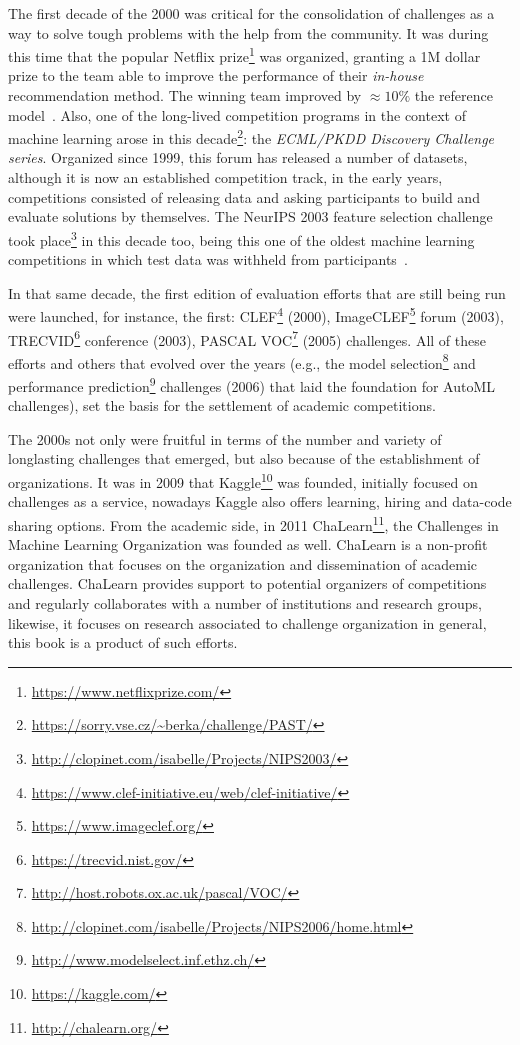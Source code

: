 \documentclass[twoside,11pt]{article}
\begin{document}
The first decade of the 2000 was critical for the consolidation of challenges as a way to solve tough problems with the help from the community. It was during this time that the popular Netflix prize\footnote{\url{https://www.netflixprize.com/}} was organized, granting a 1M dollar prize to the team able to improve the performance of their \emph{in-house} recommendation method. The winning team  improved by $\approx 10\%$ the reference model~\citep{bellkor}.  %
Also, one of the long-lived competition programs in the context  of machine learning  arose in this decade\footnote{\url{https://sorry.vse.cz/~berka/challenge/PAST/}}: the \emph{ECML/PKDD Discovery Challenge series}. Organized since 1999, this forum has released a number of datasets, although it is now an established competition track, in the early years, competitions consisted of releasing data and asking participants to build and evaluate solutions by themselves. The NeurIPS 2003 feature selection challenge took place\footnote{\url{http://clopinet.com/isabelle/Projects/NIPS2003/}} in this decade too, being this one of the oldest  machine learning competitions in which test data was withheld from participants~\citep{NIPS2004_5e751896}. 
 

In that same decade, the first edition of evaluation efforts that are still being run were launched, for instance, the first: CLEF\footnote{\url{https://www.clef-initiative.eu/web/clef-initiative/}} (2000),   ImageCLEF\footnote{{\url{https://www.imageclef.org/}}} forum (2003),  TRECVID\footnote{\url{https://trecvid.nist.gov/}} conference (2003),  PASCAL VOC\footnote{\url{http://host.robots.ox.ac.uk/pascal/VOC/}} (2005) challenges. All of these efforts and others that evolved over the years (e.g.,  the model selection\footnote{\url{http://clopinet.com/isabelle/Projects/NIPS2006/home.html}} and performance prediction\footnote{\url{http://www.modelselect.inf.ethz.ch/}} challenges (2006) that laid the foundation for AutoML challenges), set the basis for the settlement of academic competitions. %

The 2000s not only were fruitful in terms of the number and variety of longlasting challenges that emerged, but also because of the establishment of organizations. It was in 2009 that Kaggle\footnote{\url{https://kaggle.com/}} was founded, initially focused on challenges as a service, nowadays Kaggle also offers learning, hiring and data-code sharing options. From the academic side, in 2011 ChaLearn\footnote{\url{http://chalearn.org/}}, the Challenges in Machine Learning Organization was founded as well. ChaLearn is a non-profit organization that focuses on the organization and dissemination of academic challenges. ChaLearn provides support to potential organizers of competitions and regularly collaborates with a number of institutions and research groups, likewise, it focuses on research associated to challenge organization in general, this book is a product of such efforts.   
\end{document}
